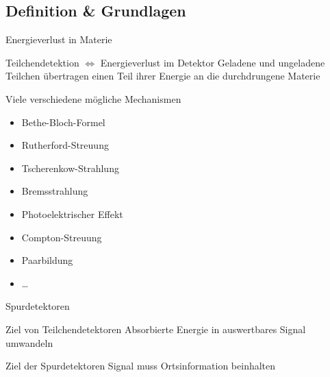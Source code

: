 
\subsection[]{Definition \& Grundlagen}





\begin{frame}{Energieverlust in Materie}
	\begin{block}{Teilchendetektion $\Leftrightarrow$ Energieverlust im Detektor}
		Geladene und ungeladene Teilchen übertragen einen Teil ihrer Energie an die
		durchdrungene Materie	
	\end{block}
	
	
	\begin{block}{Viele verschiedene mögliche Mechanismen}
		\begin{itemize}
		  \item Bethe-Bloch-Formel
		  \item Rutherford-Streuung
		  \item Tscherenkow-Strahlung
		  \item Bremsstrahlung
		  \item Photoelektrischer Effekt
		  \item Compton-Streuung
		  \item Paarbildung
		  \item \ldots
		\end{itemize}
	\end{block}
\end{frame}


\begin{frame}{Spurdetektoren}
	\begin{block}{Ziel von Teilchendetektoren}
		Absorbierte Energie in auswertbares Signal umwandeln 
	\end{block}
	\vspace{1cm}
	\begin{exampleblock}{Ziel der Spurdetektoren}
		Signal muss Ortsinformation beinhalten
	\end{exampleblock}
\end{frame}

